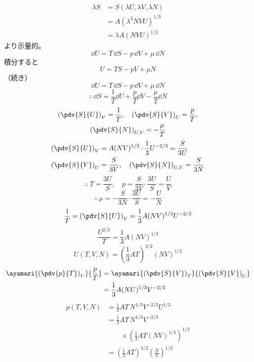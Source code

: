 \begin{align*}
\lambda S&=S(\lambda U,\lambda V,\lambda N)\\
&=A(\lambda^{3}NVU)^{1/3}\\
&=\lambda A(NVU)^{1/3}
\end{align*}
より示量的。
\[ \dd U=T\,\dd S-p\,\dd V+\mu\,\dd N \]
積分すると
\[ U=TS-pV+\mu N \]
（続き）
\[ \dd U=T\,\dd S-p\,\dd V+\mu\,\dd N \]
\[ \therefore\ \dd S=\frac{1}{T}\dd U+\frac{p}{T}\dd V-\frac{\mu}{T}\dd N \]
\begin{gather*}
\left(\pdv{S}{U}\right)_{V}=\frac{1}{T},\quad\left(\pdv{S}{V}\right)_{U}=\frac{p}{T},\\
\left(\pdv{S}{N}\right)_{U,V}=-\frac{\mu}{T}
\end{gather*}
\begin{align*}
\left(\pdv{S}{U}\right)_{V}&=A(NV)^{1/3}\cdot\frac{1}{3}U^{-2/3}=\frac{S}{3U}\\
\left(\pdv{S}{V}\right)_{U}&=\frac{S}{3V},\quad\left(\pdv{S}{N}\right)_{U,V}=\frac{S}{3N}
\end{align*}
\[ \therefore\ T=\frac{3U}{S},\quad p=\frac{S}{3V}\cdot\frac{3U}{S}=\frac{U}{V} \]
\[ \therefore\ \mu=-\frac{S}{3N}\cdot\frac{3U}{S}=-\frac{U}{N} \]
\[ \frac{1}{T}=\left(\pdv{S}{U}\right)_{V}=\frac{1}{3}A(NV)^{1/3}U^{-2/3} \]
\[ \frac{U^{2/3}}{T}=\frac{1}{3}A(NV)^{1/3} \]
\[ U(T,V,N)=\left(\frac{1}{3}AT\right)^{3/2}(NV)^{1/2} \]
\begin{align*}
\ayamari{\left(\pdv{p}{T}\right)_{V}}{\frac{p}{T}}&=\ayamari{\left(\pdv{S}{V}\right)_{T}}{\left(\pdv{S}{V}\right)_{U}}\\
&=\frac{1}{3}A(NU)^{1/3}V^{-2/3}
\end{align*}
\begin{align*}
p(T,V,N)&=\frac{1}{3}AT\,N^{1/3}V^{-2/3}U^{1/3}\\
&=\frac{1}{3}AT\,N^{1/3}V^{-2/3}\\
&\qquad\times\left(\frac{1}{3}AT(NV)^{1/3}\right)^{1/2}\\
&=\left(\frac{1}{3}AT\right)^{3/2}\left(\frac{N}{V}\right)^{1/2}
\end{align*}

